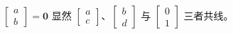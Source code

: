 \begin{solution}
\newpage
		\begin{case}{2}{$\begin{bmatrix}
					a\\b
				\end{bmatrix} = \textbf{0}$}
			显然 $\begin{bmatrix}
				a\\c
			\end{bmatrix}$、$\begin{bmatrix}
				b\\d
			\end{bmatrix}$ 与 $\begin{bmatrix}
				0\\1
			\end{bmatrix}$ 三者共线。
		\end{case}
	\end{solution}
	
